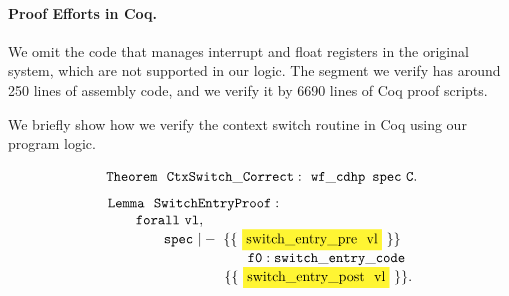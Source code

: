\paragraph{\textbf{Proof Efforts in Coq.}}
We omit the code that manages interrupt
and float registers in the original
system, which are not supported in our logic.
The segment we verify has around 250 lines
of assembly code,
and we verify it by 6690 lines of %
Coq proof scripts.

We briefly show how we verify the 
context switch routine in Coq using our program logic. 
% 
\begin{center}
    \vspace*{-0.8cm}
    $$ \ 
    {\tt Theorem \ \ CtxSwitch\_Correct: } \ \ 
    {\tt wf\_cdhp \ \, spec \ C}.
    $$
    $$
    \begin{array}{l}
        {\tt Lemma \ \ SwitchEntryProof: } \\
        \qquad 
        {\tt forall \ vl,} \\
        \qquad \qquad
        {\tt spec \ |- \ \{\{ \ \colorbox{yellow!80}{switch\_entry\_pre \ vl} \ \}\} } \\
        \qquad \qquad \qquad \qquad \qquad
        {\tt f0 : switch\_entry\_code} \\
        \qquad \qquad \qquad \qquad
        {\tt \ \{\{ \ \colorbox{yellow!80}{switch\_entry\_post \ vl} \ \}\}. }
    \end{array}
    $$
    \label{fig:Coq code Example}
\end{center}
